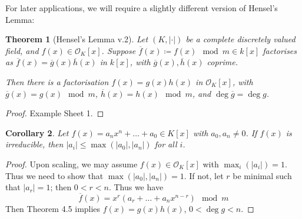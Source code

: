 \documentclass[]{article}
\theoremstyle{custhm}
\newtheorem{theorem}{Theorem}[section]
\theoremstyle{cusdef}
\theoremstyle{custhm}
\theoremstyle{custhm}
\newtheorem{cor}[theorem]{Corollary}
\theoremstyle{custhm}
\theoremstyle{custhm}
\theoremstyle{cusdef}
\theoremstyle{remark}
\newcommand{\valk}{(K,|\cdot|)}
\renewcommand{\bar}{\overline}
\renewcommand{\O}{\mathcal{O}}
\begin{document}
For later applications, we will require a slightly different version of Hensel's Lemma:

\begin{theorem}[Hensel's Lemma v.2]
Let $\valk$ be a complete discretely valued field, and $f(x)\in \O_K[x]$. Suppose $\bar{f}(x)\coloneqq f(x)\mod m\in k[x]$ factorises as $\bar{f}(x) = \bar{g}(x)\bar{h}(x)$ in $k[x]$, with $\bar{g}(x),\bar{h}(x)$ coprime.

Then there is a factorisation $f(x) = g(x)h(x)$ in $\O_K[x]$, with $\bar{g}(x) = g(x) \mod m$, $\bar{h}(x) = h(x)\mod m$, and $\deg \bar{g} = \deg g$.
\end{theorem}
\begin{proof}
Example Sheet 1.
\end{proof}
\begin{cor}
Let $f(x) = a_nx^n + \dots + a_0 \in K[x]$ with $a_0,a_n\ne 0$. If $f(x)$ is irreducible, then $|a_i| \le \max (|a_0|,|a_n|)$ for all $i$.
\end{cor}
\begin{proof}
Upon scaling, we may assume $f(x)\in \O_K[x]$ with $\max_i (|a_i|) = 1$. Thus we need to show that $\max(|a_0|,|a_n|) = 1$. If not, let $r$ be minimal such that $|a_r| = 1$; then $0 < r < n$. Thus we have
\[
\bar{f}(x) = x^r(a_r + \dots + a_n x^{n-r})\mod m
\]
Then Theorem 4.5 implies $f(x) = g(x)h(x)$, $0 < \deg g < n$.
\end{proof}
\end{document}

